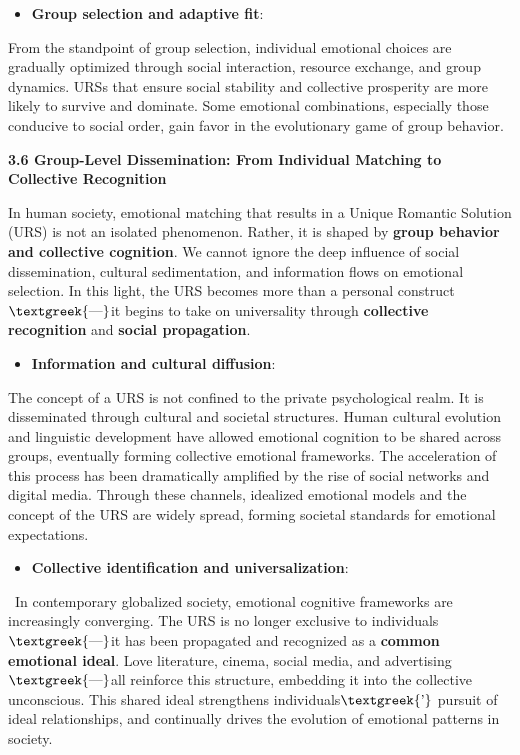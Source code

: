 \documentclass[a4paper]{article}
\begin{document}
\begin{itemize}[resume*=listWWNumv]
\item \textbf{Group selection and adaptive fit}: 
\end{itemize}
From the standpoint of group selection, individual emotional choices are gradually optimized through social interaction,
resource exchange, and group dynamics. URSs that ensure social stability and collective prosperity are more likely to
survive and dominate. Some emotional combinations, especially those conducive to social order, gain favor in the
evolutionary game of group behavior.

\textbf{3.6 Group-Level Dissemination: From Individual Matching to Collective Recognition}

In human society, emotional matching that results in a {\textquotedbl}Unique Romantic Solution{\textquotedbl} (URS) is
not an isolated phenomenon. Rather, it is shaped by \textbf{group behavior and collective cognition}. We cannot ignore
the deep influence of social dissemination, cultural sedimentation, and information flows on emotional selection. In
this light, the URS becomes more than a personal construct$\text{\textgreek{—}}$it begins to take on universality
through \textbf{collective recognition} and \textbf{social propagation}.

\begin{itemize}[series=listWWNumvi,label=[F0B7?]]
\item \textbf{Information and cultural diffusion}: 
\end{itemize}
The concept of a URS is not confined to the private psychological realm. It is disseminated through cultural and
societal structures. Human cultural evolution and linguistic development have allowed emotional cognition to be shared
across groups, eventually forming collective emotional frameworks. The acceleration of this process has been
dramatically amplified by the rise of social networks and digital media. Through these channels, idealized emotional
models and the concept of the URS are widely spread, forming societal standards for emotional expectations.

\begin{itemize}[resume*=listWWNumvi]
\item \textbf{Collective identification and universalization}:
\end{itemize}
\ In contemporary globalized society, emotional cognitive frameworks are increasingly converging. The URS is no longer
exclusive to individuals$\text{\textgreek{—}}$it has been propagated and recognized as a \textbf{common emotional
ideal}. Love literature, cinema, social media, and advertising$\text{\textgreek{—}}$all reinforce this structure,
embedding it into the collective unconscious. This shared ideal strengthens individuals$\text{\textgreek{’}}$ pursuit
of ideal relationships, and continually drives the evolution of emotional patterns in society.
\end{document}
